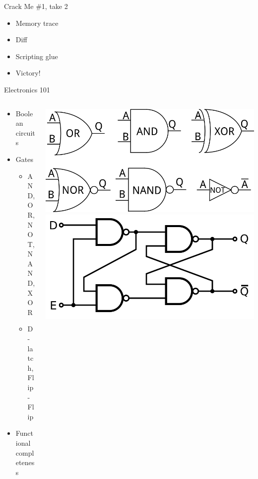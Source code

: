 \documentclass[10pt, compress]{beamer}
\begin{document}
\begin{frame}{Crack Me \#1, take 2}
	\begin{itemize}
    \item Memory trace
    \item Diff
    \item Scripting glue
    \item Victory!
    \end{itemize}
\end{frame}

\begin{frame}{Electronics 101}
\begin{columns}
		\begin{column}{0.6\textwidth}
	\begin{itemize}
	\item Boolean circuits
	\item Gates
	\begin{itemize}
	  \item AND, OR, NOT, NAND, XOR
	  \item D-latch, Flip-Flip
	\end{itemize}
	\item Functional completeness
	\end{itemize}
	\end{column}
		\begin{column}{0.4\textwidth}
			\includegraphics[width=1\textwidth]{images/gates.png}
			\linebreak
			\linebreak
			\includegraphics[width=1\textwidth]{images/d-latch.png}
		\end{column}
	\end{columns}

\end{frame}
\end{document}
